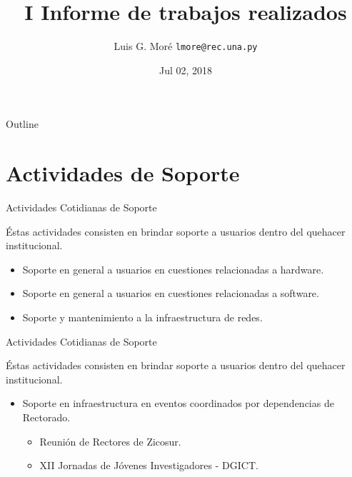 \documentclass[usenames,dvipsnames]{beamer}
\title[Rectorado - UNA]{ \vspace{30pt} I Informe de trabajos realizados}
\date[Jul 02, 2018]{Jul 02, 2018}
\author[Luis G. Moré]{
\vspace{1cm}
Luis G. Moré
\pdfnewline
\texttt{lmore@rec.una.py}
}
\institute{Universidad Nacional de Asunción - Rectorado}
\begin{document}
\begin{frame}
\titlepage
\end{frame}

\begin{frame}{Outline}
\tableofcontents
\end{frame}


\section{Actividades de Soporte}
\begin{frame}{Actividades Cotidianas de Soporte}

Éstas actividades consisten en brindar soporte a usuarios dentro del quehacer institucional.
             	
\begin{itemize}
    \item Soporte en general a usuarios en cuestiones relacionadas a hardware.
	\item Soporte en general a usuarios en cuestiones relacionadas a software.
	\item Soporte y mantenimiento a la infraestructura de redes.
\end{itemize}


\end{frame}

\begin{frame}{Actividades Cotidianas de Soporte}

Éstas actividades consisten en brindar soporte a usuarios dentro del quehacer institucional.
             	
\begin{itemize}
    \item Soporte en infraestructura en eventos coordinados por dependencias de Rectorado.
    
    \begin{itemize}
		\item Reunión de Rectores de Zicosur.
		\item XII Jornadas de Jóvenes Investigadores - DGICT.
	\end{itemize}

\end{itemize}

\end{frame}
\end{document}
